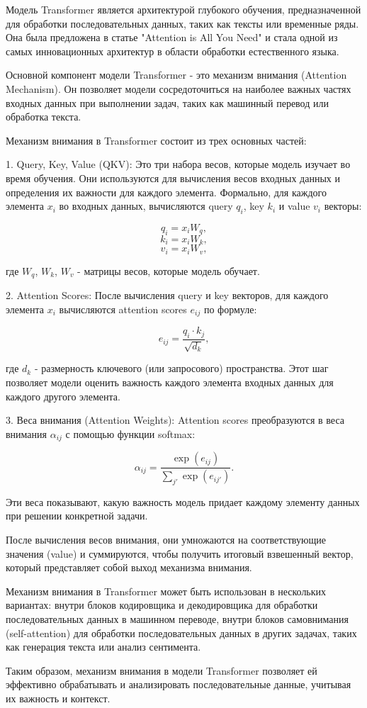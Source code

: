 Модель Transformer является архитектурой глубокого обучения, предназначенной для обработки последовательных данных, таких как тексты или временные ряды. Она была предложена в статье "Attention is All You Need" и стала одной из самых инновационных архитектур в области обработки естественного языка.

Основной компонент модели Transformer - это механизм внимания (Attention Mechanism). Он позволяет модели сосредоточиться на наиболее важных частях входных данных при выполнении задач, таких как машинный перевод или обработка текста.

Механизм внимания в Transformer состоит из трех основных частей:

1. Query, Key, Value (QKV): Это три набора весов, которые модель изучает во время обучения. Они используются для вычисления весов входных данных и определения их важности для каждого элемента. Формально, для каждого элемента \(x_i\) во входных данных, вычисляются query \(q_i\), key \(k_i\) и value \(v_i\) векторы:

\[ q_i = x_iW_q, \]
\[ k_i = x_iW_k, \]
\[ v_i = x_iW_v, \]

где \(W_q\), \(W_k\), \(W_v\) - матрицы весов, которые модель обучает.

2. Attention Scores: После вычисления query и key векторов, для каждого элемента \(x_i\) вычисляются attention scores \(e_{ij}\) по формуле:

\[ e_{ij} = \frac{q_i \cdot k_j}{\sqrt{d_k}}, \]

где \(d_k\) - размерность ключевого (или запросового) пространства. Этот шаг позволяет модели оценить важность каждого элемента входных данных для каждого другого элемента.

3. Веса внимания (Attention Weights): Attention scores преобразуются в веса внимания \( \alpha_{ij} \) с помощью функции softmax:

\[ \alpha_{ij} = \frac{\exp(e_{ij})}{\sum_{j'} \exp(e_{ij'})}. \]

Эти веса показывают, какую важность модель придает каждому элементу данных при решении конкретной задачи. 

После вычисления весов внимания, они умножаются на соответствующие значения (value) и суммируются, чтобы получить итоговый взвешенный вектор, который представляет собой выход механизма внимания.

Механизм внимания в Transformer может быть использован в нескольких вариантах: внутри блоков кодировщика и декодировщика для обработки последовательных данных в машинном переводе, внутри блоков самовнимания (self-attention) для обработки последовательных данных в других задачах, таких как генерация текста или анализ сентимента.

Таким образом, механизм внимания в модели Transformer позволяет ей эффективно обрабатывать и анализировать последовательные данные, учитывая их важность и контекст.

